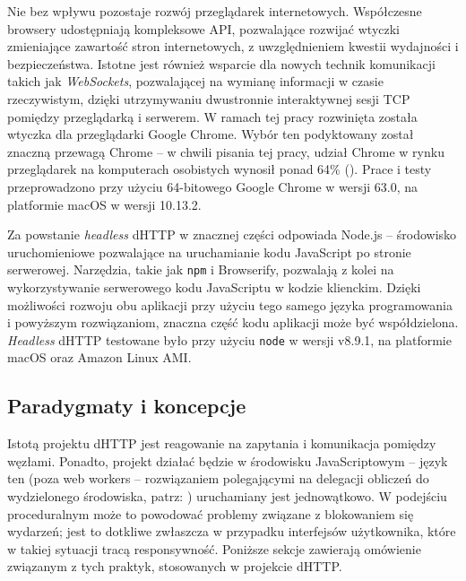 Nie bez wpływu pozostaje rozwój przeglądarek internetowych. Współczesne browsery udostępniają kompleksowe API, pozwalające rozwijać wtyczki zmieniające zawartość stron internetowych, z uwzględnieniem kwestii wydajności i bezpieczeństwa. Istotne jest również wsparcie dla nowych technik komunikacji takich jak {\em WebSockets}, pozwalającej na wymianę informacji w czasie rzeczywistym, dzięki utrzymywaniu dwustronnie interaktywnej sesji TCP pomiędzy przeglądarką i serwerem. W ramach tej pracy rozwinięta została wtyczka dla przeglądarki Google Chrome. Wybór ten podyktowany został znaczną przewagą Chrome -- w chwili pisania tej pracy, udział Chrome w rynku przeglądarek na komputerach osobistych wynosił ponad 64\% (\cite{chromeStats}). Prace i testy przeprowadzono przy użyciu 64-bitowego Google Chrome w wersji 63.0, na platformie macOS w wersji 10.13.2.

Za powstanie {\em headless} dHTTP w znacznej części odpowiada Node.js -- środowisko uruchomieniowe pozwalające na uruchamianie kodu JavaScript po stronie serwerowej.  Narzędzia, takie jak \texttt{npm} i Browserify, pozwalają z kolei na wykorzystywanie serwerowego kodu JavaScriptu w kodzie klienckim. Dzięki możliwości rozwoju obu aplikacji przy użyciu tego samego języka programowania i powyższym rozwiązaniom, znaczna część  kodu aplikacji może być współdzielona. {\em Headless} dHTTP testowane było przy użyciu \texttt{node} w wersji v8.9.1, na platformie macOS oraz Amazon Linux AMI.


\subsection{Paradygmaty i koncepcje}
Istotą projektu dHTTP jest reagowanie na zapytania i komunikacja pomiędzy węzłami. Ponadto, projekt działać będzie w środowisku JavaScriptowym -- język ten (poza web workers -- rozwiązaniem polegającymi na delegacji obliczeń do wydzielonego środowiska, patrz: \cite{webWorkers}) uruchamiany jest jednowątkowo. W podejściu proceduralnym może to powodować problemy związane z blokowaniem się wydarzeń; jest to dotkliwe zwłaszcza w przypadku interfejsów użytkownika, które w takiej sytuacji tracą responsywność. Poniższe sekcje zawierają omówienie związanym z tych praktyk, stosowanych w projekcie dHTTP.

